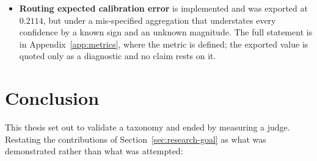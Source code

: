 \begin{itemize}
\item \textbf{Routing expected calibration error} is implemented and
was exported at $0.2114$, but under a mis-specified aggregation that
understates every confidence by a known sign and an unknown magnitude.
The full statement is in Appendix~\ref{app:metrics}, where the metric
is defined; the exported value is quoted only as a diagnostic and no
claim rests on it.

\end{itemize}




\section{Conclusion}\label{sec:conclusion}

This thesis set out to validate a taxonomy and ended by measuring a
judge. Restating the contributions of
Section~\ref{sec:research-goal} as what was demonstrated rather than
what was attempted:

